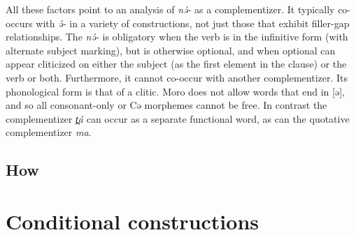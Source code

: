All these factors point to an analysis of \textit{nə́-} as a complementizer. It typically co-occurs with \textit{ə́-} in a variety of constructions, not just those that exhibit filler-gap relationships. The \textit{nə́-} is obligatory when the verb is in the infinitive form (with alternate subject marking), but is otherwise optional, and when optional can appear cliticized on either the subject (as the first element in the clause) or the verb or both. Furthermore, it cannot co-occur with another complementizer. Its phonological form is that of a clitic. Moro does not allow words that end in [ə], and so all consonant-only or Cə morphemes cannot be free. In contrast the complementizer \textit{t̪á} can occur as a separate functional word, as can the quotative complementizer \textit{ma}.

\subsection{How}\label{how}


\section{Conditional constructions}

